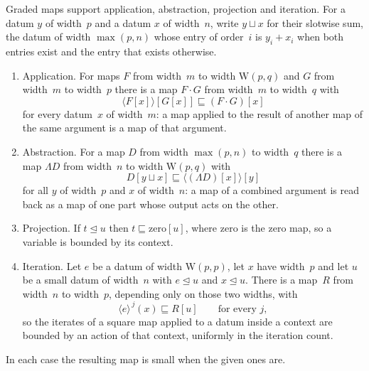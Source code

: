 \documentclass[11pt]{amsart}
\makeatletter
\newcommand{\bplus}{\mathbin{+}}
\newcommand{\W}{\mathrm{W}}
\newcommand{\tle}{\mathrel{\sqsubseteq}}      %
\newcommand{\tsub}{\mathrel{\trianglelefteq}} %
\newcommand{\act}[2]{#1[#2]}                  %
\newcommand{\rd}[1]{\langle #1 \rangle}       %
\newif\ifagdarefs
\newcommand{\AgdaRefs}[1]{\ifagdarefs{\footnotesize\color{agdablue}(#1)}\else\unskip\fi}
\newcommand{\Agda}[2]{{\footnotesize\color{agdablue}\textsf{#1}%
  \ifblank{#2}{}{\texttt{.}\allowbreak\texttt{#2}}}}
\let\ttt@plain\texttt
\renewcommand{\texttt}[1]{{\footnotesize\color{agdablue}\ttt@plain{#1}}}
\theoremstyle{plain}
\theoremstyle{definition}
\makeatother
\begin{document}
\begin{lemma}
\label{lem:calculus}
Graded maps support application, abstraction, projection and
iteration. For a datum $y$ of width~$p$ and a datum $x$ of width~$n$,
write $y \sqcup x$ for their slotwise sum, the datum of width
$\max(p,n)$ whose entry of order~$i$ is $y_i \bplus x_i$ when both
entries exist and the entry that exists otherwise.
\begin{enumerate}
\item\label{item:apply}
  Application. For maps $F$ from width~$m$ to width $\W(p,q)$ and $G$
  from width~$m$ to width~$p$ there is a map $F\cdot G$ from width~$m$
  to width~$q$ with
  \[
    \act{\rd{\act F x}}{\act G x} \tle \act{(F\cdot G)}{x}
  \]
  for every datum~$x$ of width~$m$: a map applied to the result of
  another map of the same argument is a map of that argument.
\item\label{item:curry}
  Abstraction. For a map $D$ from width $\max(p,n)$ to width~$q$ there
  is a map $\Lambda D$ from width~$n$ to width $\W(p,q)$ with
  \[
    \act{D}{y \sqcup x} \tle \act{\rd{\act{(\Lambda D)}{x}}}{y}
  \]
  for all $y$ of width~$p$ and $x$ of width~$n$: a map of a combined
  argument is read back as a map of one part whose output acts on the
  other.
\item\label{item:var}
  Projection. If $t \tsub u$ then $t \tle \act{\mathrm{zero}}{u}$,
  where $\mathrm{zero}$ is the zero map, so a variable is bounded by
  its context.
\item\label{item:orbit}
  Iteration. Let $e$ be a datum of width $\W(p,p)$, let $x$ have
  width~$p$ and let $u$ be a small datum of width~$n$ with $e \tsub u$
  and $x \tsub u$. There is a map~$R$ from width~$n$ to width~$p$,
  depending only on those two widths, with
  \[
    \rd e^{\,j}(x) \tle \act{R}{u} \qquad \text{for every } j ,
  \]
  so the iterates of a square map applied to a datum inside a context
  are bounded by an action of that context, uniformly in the
  iteration count.
\end{enumerate}
In each case the resulting map is small when the given ones are.
\AgdaRefs{\Agda{BrouwerOrdinals.RectApply}{rect-ssub}; \texttt{sh},
\texttt{sh-All<}; \Agda{BrouwerOrdinals.RectCurry}{rect-curry},
\texttt{curryD}, \texttt{curryD-All<}, \texttt{cmb};
\Agda{BrouwerOrdinals.RectAlgebra}{rect-⊴}, \texttt{zeroRD},
\texttt{flatRD}; \Agda{BrouwerOrdinals.RectOrbitAct}{rorbit-act},
\texttt{rorbitD}.}
\end{lemma}
\end{document}
